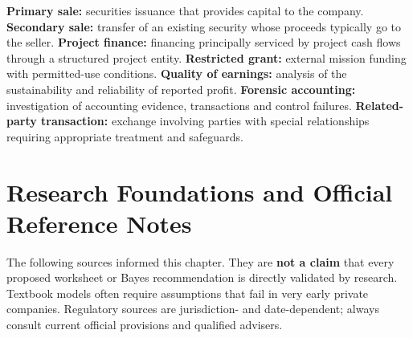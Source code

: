 \textbf{Primary sale:} securities issuance that provides capital to the company. \textbf{Secondary sale:} transfer of an existing security whose proceeds typically go to the seller. \textbf{Project finance:} financing principally serviced by project cash flows through a structured project entity. \textbf{Restricted grant:} external mission funding with permitted-use conditions. \textbf{Quality of earnings:} analysis of the sustainability and reliability of reported profit. \textbf{Forensic accounting:} investigation of accounting evidence, transactions and control failures. \textbf{Related-party transaction:} exchange involving parties with special relationships requiring appropriate treatment and safeguards.

\section{Research Foundations and Official Reference Notes}

The following sources informed this chapter. They are \textbf{not a claim} that every proposed worksheet or Bayes recommendation is directly validated by research. Textbook models often require assumptions that fail in very early private companies. Regulatory sources are jurisdiction- and date-dependent; always consult current official provisions and qualified advisers.

